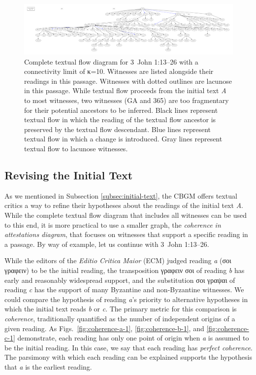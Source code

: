 \documentclass[a4paper, 12pt]{article}
\begin{document}
	\begin{figure}
		\includegraphics[width=\textwidth]{../graphics/B25K1V13U24-26-textual-flow.pdf}
		\caption{Complete textual flow diagram for 3~John 1:13–26 with a connectivity limit of κ=10. Witnesses are listed alongside their readings in this passage. Witnesses with dotted outlines are lacunose in this passage. While textual flow proceeds from the initial text \emph{A} to most witnesses, two witnesses (GA  and 365) are too fragmentary for their potential ancestors to be inferred. Black lines represent textual flow in which the reading of the textual flow ancestor is preserved by the textual flow descendant. Blue lines represent textual flow in which a change is introduced. Gray lines represent textual flow to lacunose witnesses.}
		\label{fig:textual-flow}
	\end{figure}
	
	\newpage
	
	\subsection{Revising the Initial Text}\label{subsec:revising-initial-text}
	As we mentioned in Subsection \ref{subsec:initial-text}, the CBGM offers textual critics a way to refine their hypotheses about the readings of the initial text \emph{A}. While the complete textual flow diagram that includes all witnesses can be used to this end, it is more practical to use a smaller graph, the \emph{coherence in attestations diagram}, that focuses on witnesses that support a specific reading in a passage. By way of example, let us continue with 3~John 1:13–26.
	
	While the editors of the \emph{Editio Critica Maior} (ECM) judged reading \emph{a} (σοι γραφειν) to be the initial reading, the transposition γραφειν σοι of reading \emph{b} has early and reasonably widespread support, and the substitution σοι γραψαι of reading \emph{c} has the support of many Byzantine and non-Byzantine witnesses. We could compare the hypothesis of reading \emph{a}'s priority to alternative hypotheses in which the initial text reads \emph{b} or \emph{c}. The primary metric for this comparison is \emph{coherence}, traditionally quantified as the number of independent origins of a given reading. As Figs.~\ref{fig:coherence-a-1}, \ref{fig:coherence-b-1}, and \ref{fig:coherence-c-1} demonstrate, each reading has only one point of origin when \emph{a} is assumed to be the initial reading. In this case, we say that each reading has \emph{perfect coherence}. The parsimony with which each reading can be explained supports the hypothesis that \emph{a} is the earliest reading.
	
\end{document}
